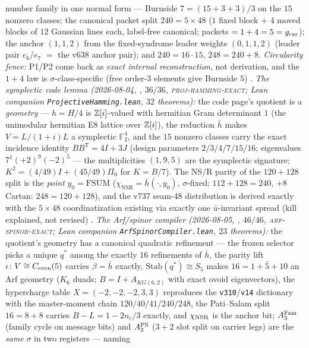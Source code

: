 \begin{winbox}
number family in one normal form --- Burnside $7=(15+3+3)/3$ on the
$15$ nonzero classes; the canonical packet split $240=5\times48$
($1$ fixed block $+$ $4$ moved blocks of $12$ Gaussian lines each,
label-free canonical; packets $=1+4=5=g_{\mathrm{car}}$); the anchor $(1,1,2)$
from the fixed-syndrome leader weights $(0,1,1,2)$ (leader pair
$e_6/e_7$ $=$ the v638 anchor pair); and $240=16\cdot15$,
$248=240+8$.  \emph{Circularity fence:} P1/P2 come back as
\emph{exact internal reconstruction}, not derivation, and the $1+4$
law is $\sigma$-class-specific (free order-$3$ elements give
Burnside $5$) \mE.
\emph{The symplectic code lemma (2026-08-04,
, $36/36$,
\textsc{proj-hamming-exact}; Lean companion
\texttt{ProjectiveHamming.lean}, $32$ theorems):} the code page's
quotient is a \emph{geometry} --- $h=H/4$ is $\mathbb{Z}[i]$-valued with
hermitian Gram determinant $1$ (the unimodular hermitian E8 lattice
over $\mathbb{Z}[i]$), the reduction $\bar h$ makes $V=L/(1+i)L$ a
symplectic $\mathbb{F}_2^4$, and the $15$ nonzero classes carry the
exact incidence identity $BB^{\mathsf T}=4I+3J$ (design parameters
$2/3/4/7/15/16$; eigenvalues $7^1(+2)^9(-2)^5$ --- the
multiplicities $(1,9,5)$ are the symplectic signature;
$K^2=(4/49)I+(45/49)\Pi_0$ for $K=B/7$).  The NS/R parity of the
$120+128$ split is the \emph{point} $y_0=\mathrm{FSUM}$
($\chi_{\mathrm{NSR}}=\bar h(\cdot,y_0)$, $\sigma$-fixed;
$112+128=240$, $+8$ Cartan: $248=120+128$), and the v737 seam-48
distribution is derived exactly with the $5\times48$
coordinatization existing via exactly one $\bar u$-invariant spread
(kill explained, not revised) \mE.
\emph{The Arf/spinor compiler (2026-08-05,
, $46/46$,
\textsc{arf-spinor-exact}; Lean companion
\texttt{ArfSpinorCompiler.lean}, $23$ theorems):} the quotient's
geometry has a canonical quadratic refinement --- the frozen
selector picks a unique $q^{*}$ among the exactly $16$ refinements
of $\bar h$, the parity lift $\iota\colon V\cong C_{\rm even}(5)$
carries $\beta=\bar h$ exactly, $\mathrm{Stab}(q^{*})\cong S_5$
makes $16=1+\bar 5+10$ an Arf geometry ($K_6$ duads;
$B=I+A_{KG(6,2)}$ with exact ovoid eigenvectors), the hypercharge
table $X=(-2,-2,-2,3,3)$ reproduces the \texttt{v310}/\texttt{v14}
dictionary with the master-moment chain $120/40/41/240/248$, the
Pati--Salam split $16=8+8$ carries $B{-}L=1-2n_c/3$ exactly, and
$\chi_{\rm NSR}$ is the anchor bit; $A_3^{\rm Fam}$ (family cycle
on message bits) and $A_3^{\rm PS}$ ($3{+}2$ slot split on carrier
legs) are the \emph{same} $\sigma$ in two registers --- naming

\end{winbox}
